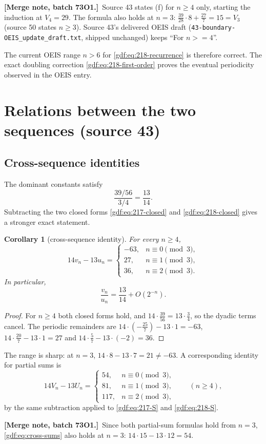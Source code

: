 \documentclass[11pt,a4paper]{article}
\numberwithin{equation}{section}
\newtheorem{corollary}[theorem]{Corollary}
\theoremstyle{definition}
\theoremstyle{remark}
\theoremstyle{plain}
\newcommand{\mergenote}[1]{\par\smallskip\noindent\textbf{[Merge note, batch 73O1.]}\ #1\par\smallskip}
\newcommand{\file}[1]{\nolinkurl{#1}}
\newcommand{\src}[1]{\textup{(source #1)}}
\begin{document}
\mergenote{Source 43 states (f) for $n\ge4$ only, starting the induction at
$V_4=29$.  The formula also holds at $n=3$: $\frac{39}{28}\cdot8+\frac{27}7=15=V_3$
(source 50 states $n\ge3$).  Source 43's delivered OEIS draft
(\file{43-boundary-OEIS_update_draft.txt}, shipped unchanged) keeps
``For $n>=4$''.}

The current OEIS range $n>6$ for \eqref{gdf:eq:218-recurrence} is therefore
correct.  The exact doubling correction \eqref{gdf:eq:218-first-order} proves
the eventual periodicity observed in the OEIS entry.

\section{Relations between the two sequences \src{43}}\label{gdf:sec:cross}

\subsection{Cross-sequence identities}

The dominant constants satisfy
\[
 \frac{39/56}{3/4}=\frac{13}{14}.
\]
Subtracting the two closed forms \eqref{gdf:eq:217-closed} and
\eqref{gdf:eq:218-closed} gives a stronger exact statement.

\begin{corollary}[cross-sequence identity]\label{gdf:cor:cross-relation}
For every $n\ge4$,
\begin{equation}\label{gdf:eq:cross-relation}
 14v_n-13u_n=
 \begin{cases}
 -63,&n\equiv0\pmod3,\\
 27,&n\equiv1\pmod3,\\
 36,&n\equiv2\pmod3.
 \end{cases}
\end{equation}
In particular,
\[
 \frac{v_n}{u_n}=\frac{13}{14}+O(2^{-n}).
\]
\end{corollary}

\begin{proof}
For $n\ge4$ both closed forms hold, and $14\cdot\frac{39}{56}=13\cdot\frac34$,
so the dyadic terms cancel.  The periodic remainders are
$14\cdot(-\frac{25}7)-13\cdot1=-63$,
$14\cdot\frac{20}7-13\cdot1=27$ and $14\cdot\frac57-13\cdot(-2)=36$.
\end{proof}

The range is sharp: at $n=3$, $14\cdot8-13\cdot7=21\ne-63$.  A corresponding
identity for partial sums is
\begin{equation}\label{gdf:eq:cross-sums}
14V_n-13U_n=
\begin{cases}
54,&n\equiv0\pmod3,\\
81,&n\equiv1\pmod3,\\
117,&n\equiv2\pmod3,
\end{cases}
\qquad(n\ge4),
\end{equation}
by the same subtraction applied to \eqref{gdf:eq:217-S} and
\eqref{gdf:eq:218-S}.
\mergenote{Since both partial-sum formulas hold from $n=3$,
\eqref{gdf:eq:cross-sums} also holds at $n=3$: $14\cdot15-13\cdot12=54$.}
\end{document}
